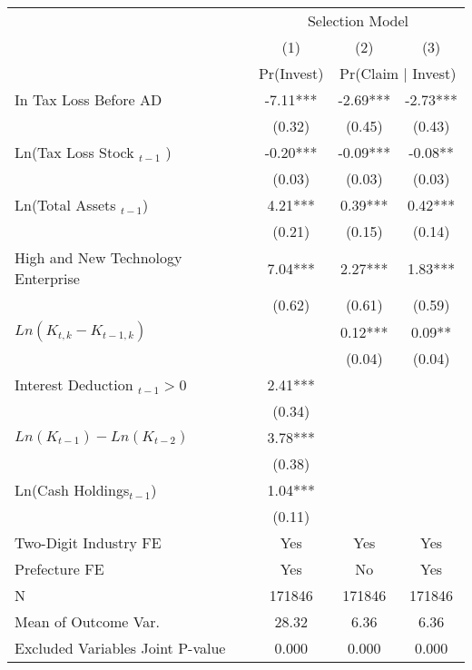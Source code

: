 \begin{tabular}{lccc} \toprule 
&\multicolumn{3}{c}{Selection Model} \\
&         (1)  &         (2)  &         (3)   \\ 
\cmidrule(lr){2-2}\cmidrule(lr){3-4} &  Pr(Invest)  & \multicolumn{2}{c}{Pr(Claim $\mid$ Invest)}  \\ 
\midrule
In Tax Loss Before AD&       -7.11***&       -2.69***&       -2.73***\\
                    &      (0.32)   &      (0.45)   &      (0.43)   \\
\addlinespace
Ln(Tax Loss Stock $_{t-1}$ )&       -0.20***&       -0.09***&       -0.08** \\
                    &      (0.03)   &      (0.03)   &      (0.03)   \\
\addlinespace
Ln(Total Assets $_{t-1}$)&        4.21***&        0.39***&        0.42***\\
                    &      (0.21)   &      (0.15)   &      (0.14)   \\
\addlinespace
High and New Technology Enterprise&        7.04***&        2.27***&        1.83***\\
                    &      (0.62)   &      (0.61)   &      (0.59)   \\
\addlinespace
$ Ln(K_{t,k} - K_{t-1,k}) $&               &        0.12***&        0.09** \\
                    &               &      (0.04)   &      (0.04)   \\
\addlinespace
Interest Deduction $_{t-1} > 0$&        2.41***&               &               \\
                    &      (0.34)   &               &               \\
\addlinespace
$ Ln(K_{t-1}) - Ln(K_{t-2})$&        3.78***&               &               \\
                    &      (0.38)   &               &               \\
\addlinespace
Ln(Cash Holdings$_{t-1}$)&        1.04***&               &               \\
                    &      (0.11)   &               &               \\
\addlinespace
\midrule
Two-Digit Industry FE&         Yes   &         Yes   &         Yes   \\
Prefecture FE       &         Yes   &          No   &         Yes   \\
N                   &      171846   &      171846   &      171846   \\
Mean of Outcome Var.&       28.32   &        6.36   &        6.36   \\
Excluded Variables Joint P-value&       0.000   &       0.000   &       0.000   \\
\bottomrule
\end{tabular}
